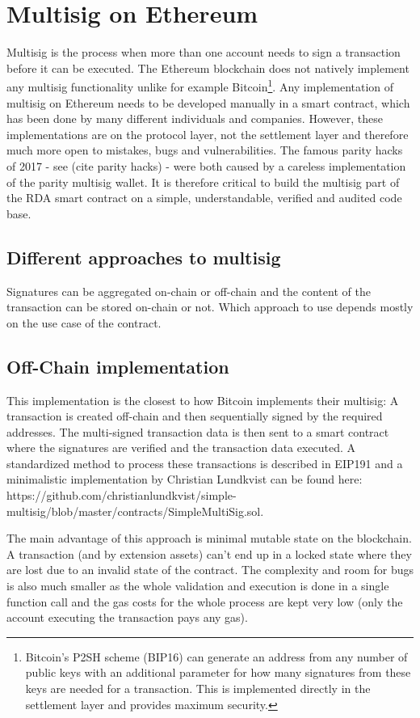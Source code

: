 \documentclass[12pt,a4paper,titlepage,oneside,english]{article}
\begin{document}
\section{Multisig on Ethereum}
Multisig is the process when more than one account needs to sign a transaction before it can be executed. The Ethereum blockchain does not natively implement any multisig functionality unlike for example Bitcoin\footnote{Bitcoin's P2SH scheme (BIP16) can generate an address from any number of public keys with an additional parameter for how many signatures from these keys are needed for a transaction. This is implemented directly in the settlement layer and provides maximum security.}. Any implementation of multisig on Ethereum needs to be developed manually in a smart contract, which has been done by many different individuals and companies. However, these implementations are on the protocol layer, not the settlement layer and therefore much more open to mistakes, bugs and vulnerabilities. The famous parity hacks of 2017 - see (cite parity hacks) - were both caused by a careless implementation of the parity multisig wallet. It is therefore critical to build the multisig part of the RDA smart contract on a simple, understandable, verified and audited code base.


\subsection{Different approaches to multisig}
Signatures can be aggregated on-chain or off-chain and the content of the transaction can be stored on-chain or not. Which approach to use depends mostly on the use case of the contract.

\subsection{Off-Chain implementation}
This implementation is the closest to how Bitcoin implements their multisig: A transaction is created off-chain and then sequentially signed by the required addresses. The multi-signed transaction data is then sent to a smart contract where the signatures are verified and the transaction data executed. A standardized method to process these transactions is described in EIP191 and a minimalistic implementation by Christian Lundkvist can be found here: https://github.com/christianlundkvist/simple-multisig/blob/master/contracts/SimpleMultiSig.sol.

The main advantage of this approach is minimal mutable state on the blockchain. A transaction (and by extension assets) can't end up in a locked state where they are lost due to an invalid state of the contract. The complexity and room for bugs is also much smaller as the whole validation and execution is done in a single function call and the gas costs for the whole process are kept very low (only the account executing the transaction pays any gas).
\end{document}
